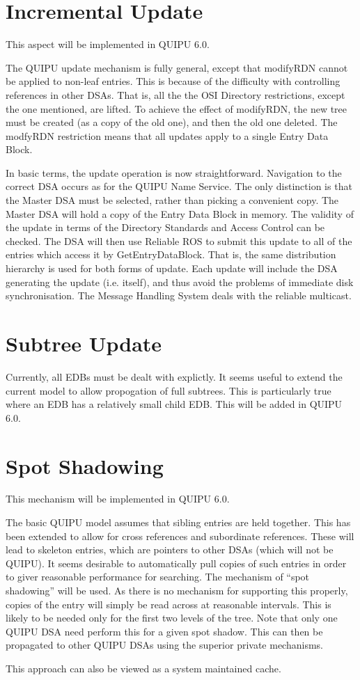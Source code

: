 \section {Incremental Update}

This aspect will be implemented in QUIPU 6.0.

The QUIPU update mechanism is fully general, except that modifyRDN cannot
be applied to non-leaf entries.  This is because of the difficulty with 
controlling references in other DSAs.
That is, all the the OSI Directory restrictions, except the one mentioned, are
lifted.
To achieve the effect of modifyRDN, the new tree must be created (as a copy of the
old one), and then the old one deleted.
The modfyRDN restriction means that all updates apply to a single Entry Data
Block.

In basic terms, the update operation is now straightforward.  Navigation to
the correct DSA occurs as for the QUIPU Name Service.  The only distinction
is that the Master DSA must be selected, rather than picking a convenient
copy.  The Master DSA will hold a copy of the Entry Data Block in memory.
The validity of the update in terms of the Directory Standards and Access
Control can be checked.  The DSA will then use Reliable ROS to submit this
update to all of the entries which access it by GetEntryDataBlock.  That is,
the same distribution hierarchy is used for both forms of update.  Each
update will include the DSA generating the update (i.e. itself), and thus
avoid the problems of immediate disk synchronisation.  
The Message Handling System deals with the reliable multicast.

\section {Subtree Update}

Currently, all EDBs must be dealt with explictly.  It seems useful to extend
the current model to allow propogation of full subtrees.  This is
particularly true where an EDB has a relatively small child EDB.   
This will be added in QUIPU 6.0.

\section {Spot Shadowing}

This mechanism will be implemented in QUIPU 6.0.

The basic QUIPU model assumes that sibling entries are held together.  This
has been extended to allow for cross references and subordinate references.
These will lead to skeleton entries, which are pointers to other DSAs (which
will not be QUIPU).  It seems desirable to automatically pull copies of such
entries in order to giver reasonable performance for searching.  The
mechanism of ``spot shadowing'' will be used.  As there is no mechanism for
supporting this properly, copies of the entry will simply be read across at
reasonable intervals.  This is likely to be needed only for the first two
levels of the tree.  Note that only one QUIPU DSA need perform this for a
given spot shadow.  This can then be propagated to other QUIPU DSAs using
the superior private mechanisms.

This approach can also be viewed as a system maintained cache.
